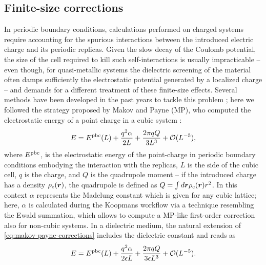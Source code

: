 \subsection{Finite-size corrections\label{sec:makov-payne}}
In periodic boundary conditions, calculations performed on charged systems require accounting for the spurious interactions between the introduced electric charge and its periodic replicas. Given the slow decay of the Coulomb potential, the size of the cell required to kill such self-interactions is usually impracticable -- even though, for quasi-metallic systems the dielectric screening of the material often damps sufficiently the electrostatic potential generated by a localized charge -- and demands for a different treatment of these finite-size effects. Several methods have been developed in the past years to tackle this problem \cite{gygi_self-consistent_1986,martyna_reciprocal_1999,dabo_electrostatics_2008,freysoldt_fully_2009,komsa_finite-size_2012}; here we followed the strategy proposed by Makov and Payne (MP), who computed the electrostatic energy of a point charge in a cubic system \cite{makov_periodic_1995}:
%
\begin{equation}
    E = E^{\rm pbc}(L) + \frac{q^2 \alpha}{2L} + \frac{2\pi q Q}{3L^3} + \mathcal{O}(L^{-5}) ,
    \label{eq:makov-payne-corrections}
\end{equation}
%
where $E^{\rm pbc}$, is the electrostatic energy of the point-charge in periodic boundary conditions embodying the interaction with the replicas, $L$ is the side of the cubic cell, $q$ is the charge, and $Q$ is the quadrupole moment -- if the introduced charge has a density $\rho_{\rm c}({\bm r})$, the quadrupole is defined as $Q = \int d{\bm r} \rho_{\rm c}({\bm r})r^2$. In this context $\alpha$ represents the Madelung constant which is given for any cubic lattice; here, $\alpha$ is calculated during the Koopmans workflow via a technique resembling the Ewald summation, which allows to compute a MP-like first-order correction also for non-cubic systems. In a dielectric medium, the natural extension of \cref{eq:makov-payne-corrections} includes the dielectric constant and reads as
%
\begin{equation}
    E = E^{\rm pbc}(L) + \frac{q^2 \alpha}{2\epsilon L} + \frac{2\pi q Q}{3\epsilon L^3} + \mathcal{O}(L^{-5}) .
    \label{eq:makov-payne-corrections-dielectric}
\end{equation}

